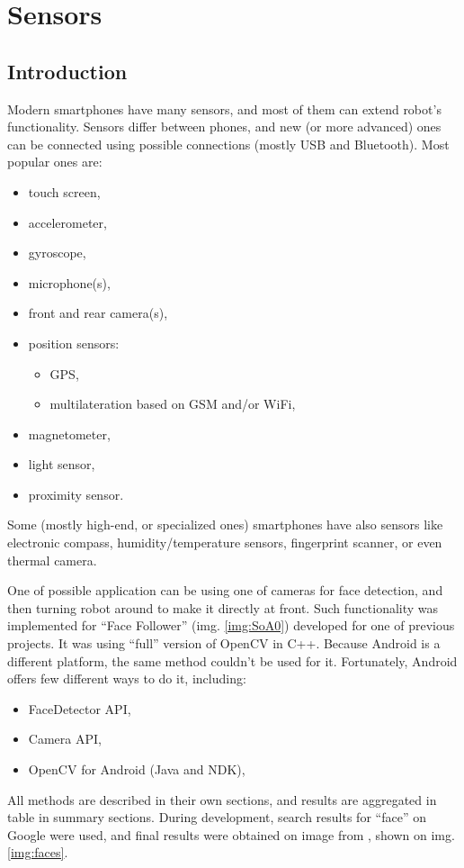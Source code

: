 \chapter{Sensors}

\section{Introduction}
Modern smartphones have many sensors, and most of them can extend robot's
functionality.
Sensors differ between phones, and new (or more advanced) ones can
be connected using possible connections (mostly USB and Bluetooth).
Most popular ones are:
\begin{itemize}
  \item touch screen,
  \item accelerometer,
  \item gyroscope,
  \item microphone(s),
  \item front and rear camera(s),
  \item position sensors:
  \begin{itemize}
    \item GPS,
    \item multilateration based on GSM and/or WiFi,
  \end{itemize}
  \item magnetometer,
  \item light sensor,
  \item proximity sensor.
\end{itemize}
Some (mostly high-end, or specialized ones) smartphones have also sensors like
electronic compass, humidity/temperature sensors, fingerprint scanner, or even
thermal camera.

One of possible application can be using one of cameras for face detection, and
then turning robot around to make it directly at front. 
Such functionality was implemented for ``Face Follower'' (img. \ref{img:SoA0})
developed for one of previous projects. 
It was using ``full'' version of OpenCV in C++. 
Because Android is a different platform, the same method couldn't be used for
it.
Fortunately, Android offers few different ways to do it, including:
\begin{itemize}
  \item FaceDetector API,
  \item Camera API,
  \item OpenCV for Android (Java and NDK),
\end{itemize}
All methods are described in their own sections, and results are aggregated in
table in summary sections. 
During development, search results for ``face'' on Google were used, and final
results were obtained on image from \cite{faces}, shown on img. \ref{img:faces}.

